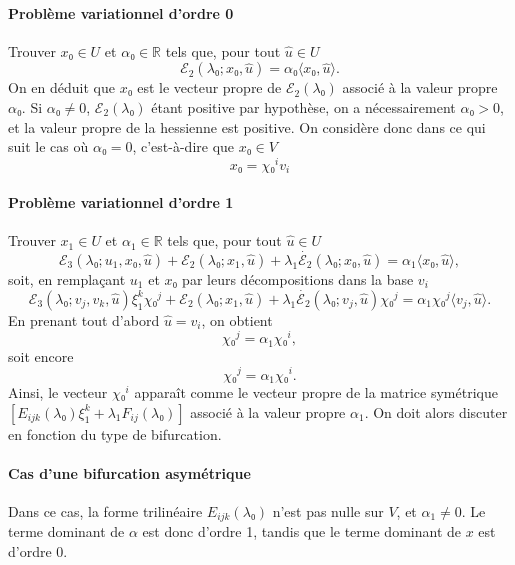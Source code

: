 \documentclass{article}
\begin{document}
\paragraph{Problème variationnel d'ordre 0}Trouver $x₀∈U$ et
$α₀∈\mathbb{R}$ tels que, pour tout $\hat{u}∈U$
\begin{equation} ℰ_2 (λ₀ ; x₀, \hat{u}) = α₀  \langle x₀, \hat{u}
   \rangle . \end{equation}
On en déduit que $x₀$ est le vecteur propre de $ℰ_2
(λ₀)$ associé à la valeur propre $α₀$. Si $α₀ \neq
0$, $ℰ_2  (λ₀)$ étant positive par hypothèse, on a
nécessairement $α₀ > 0$, et la valeur propre de la hessienne est
positive. On considère donc dans ce qui suit le cas où $α₀ = 0$,
c'est-à-dire que $x₀∈V$
\begin{equation} x₀ = \chi₀^i v_i \end{equation}


\paragraph{Problème variationnel d'ordre 1}Trouver $x_1∈U$ et
$α_1∈\mathbb{R}$ tels que, pour tout $\hat{u}∈U$
\begin{equation} ℰ_3 (λ₀ ; u_1, x₀, \hat{u}) +ℰ_2 (λ₀ ;
   x_1, \hat{u}) + λ_1  \dot{ℰ_2} (λ₀ ; x₀, \hat{u}) =
   α_1  \langle x₀, \hat{u} \rangle, \end{equation}
soit, en rempla{\c c}ant $u_1$ et $x₀$ par leurs décompositions dans la
base $v_i$
\begin{equation} ℰ_3 (λ₀ ; v_j, v_k, \hat{u}) ξ_1^k \chi₀^j
   +ℰ_2 (λ₀ ; x_1, \hat{u}) + λ_1  \dot{ℰ_2}
   (λ₀ ; v_j, \hat{u}) \chi₀^j = α_1 \chi₀^j  \langle v_j,
   \hat{u} \rangle . \end{equation}
En prenant tout d'abord $\hat{u} = v_i$, on obtient
\begin{equation} [ℰ_3 (λ₀ ; v_i, v_j, v_k) ξ_1^k + λ_1
   \dot{ℰ_2} (λ₀ ; v_i, v_j)] \chi₀^j = α_1 \chi₀^i,
\end{equation}
soit encore
\begin{equation} [E_{i  j  k} (λ₀) ξ_1^k + λ_1 F_{i
   j} (λ₀)] \chi₀^j = α_1 \chi₀^i . \end{equation}
Ainsi, le vecteur $\chi₀^i$ apparaît comme le vecteur propre de la
matrice symétrique $[E_{i  j  k} (λ₀) ξ_1^k +
λ_1 F_{i  j} (λ₀)]$ associé à la valeur propre
$α_1$. On doit alors discuter en fonction du type de bifurcation.

\paragraph{Cas d'une bifurcation asymétrique}Dans ce cas, la forme
trilinéaire $E_{i  j  k} (λ₀)$ n'est pas nulle sur
$V$, et $α_1 \neq 0$. Le terme dominant de $α$ est donc d'ordre 1,
tandis que le terme dominant de $x$ est d'ordre 0.
\end{document}
